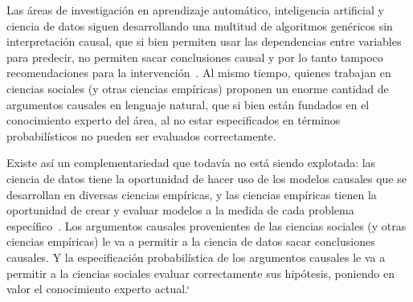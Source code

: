 \documentclass[a4paper,11pt]{book}
\theoremstyle{definition}
\begin{document}
Las \'areas de investigaci\'on en aprendizaje autom\'atico, inteligencia artificial y ciencia de datos siguen desarrollando una multitud de algoritmos gen\'ericos sin interpretaci\'on causal, que si bien permiten usar las dependencias entre variables para predecir, no permiten sacar conclusiones causal y por lo tanto tampoco recomendaciones para la intervenci\'on~\cite{pearl2009-causality}.
%
Al mismo tiempo, quienes trabajan en ciencias sociales (y otras ciencias emp\'iricas) proponen un enorme cantidad de argumentos causales en lenguaje natural, que si bien est\'an fundados en el conocimiento experto del \'area, al no estar especificados en t\'erminos probabil\'isticos no pueden ser evaluados correctamente.


Existe as\'i un complementariedad que todav\'ia no est\'a siendo explotada: las ciencia de datos tiene la oportunidad de hacer uso de los modelos causales que se desarrollan en diversas ciencias emp\'iricas, y las ciencias emp\'iricas tienen la oportunidad de crear y evaluar modelos a la medida de cada problema espec\'ifico~\cite{murphy-pmlBook1,murphy-pmlBook2, Bishop2013, Bishop2006}.
%
Los argumentos causales provenientes de las ciencias sociales (y otras ciencias emp\'iricas) le va a permitir a la ciencia de datos sacar conclusiones causales.
%
Y la especificaci\'on probabil\'istica de los argumentos causales le va a permitir a la ciencias sociales evaluar correctamente sus hip\'otesis, poniendo en valor el conocimiento experto actual.`

\end{document}
